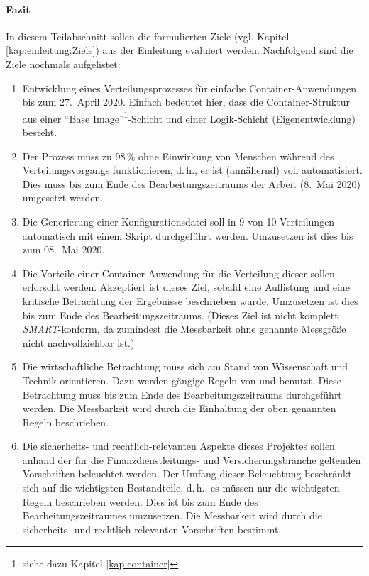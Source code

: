 \paragraph{Fazit}
In diesem Teilabschnitt sollen die formulierten Ziele (vgl. Kapitel \vref{kap:einleitung:Ziele}) aus der Einleitung evaluiert werden. Nachfolgend sind die Ziele nochmals aufgelistet:

\begin{enumerate}
	\item Entwicklung eines Verteilungsprozesses für einfache Container-Anwendungen bis zum 27.~April 2020. Einfach bedeutet hier, dass die Container-Struktur aus einer \enquote{Base Image}\footnote{siehe dazu Kapitel \vref{kap:container}}-Schicht und einer Logik-Schicht (Eigenentwicklung) besteht.
	\item Der Prozess muss zu 98\,\% ohne Einwirkung von Menschen während des Verteilungsvorgangs funktionieren, d.\,h., er ist (annähernd) voll automatisiert. Dies muss bis zum Ende des Bearbeitungszeitraums der Arbeit (8.~Mai 2020) umgesetzt werden.
	\item Die Generierung einer Konfigurationsdatei soll in 9 von 10 Verteilungen automatisch mit einem Skript durchgeführt werden. Umzusetzen ist dies bis zum 08.~Mai 2020.
	\item Die Vorteile einer Container-Anwendung für die Verteilung dieser sollen erforscht werden. Akzeptiert ist dieses Ziel, sobald eine Auflistung und eine kritische Betrachtung der Ergebnisse beschrieben wurde. Umzusetzen ist dies bis zum Ende des Bearbeitungszeitraums. (Dieses Ziel ist nicht komplett \textit{SMART}-konform, da zumindest die Messbarkeit ohne genannte Messgröße nicht nachvollziehbar ist.)
	\item Die wirtschaftliche Betrachtung muss sich am Stand von Wissenschaft und Technik orientieren. Dazu werden gängige Regeln von \cite{herman_is_2009} und \cite{brugger_it_2009} benutzt. Diese Betrachtung muss bis zum Ende des Bearbeitungszeitraums durchgeführt werden. Die Messbarkeit wird durch die Einhaltung der oben genannten Regeln beschrieben.
	\item Die sicherheits- und rechtlich-relevanten Aspekte dieses Projektes sollen anhand der für die Finanzdienstleitungs- und Versicherungsbranche geltenden Vorschriften beleuchtet werden. Der Umfang dieser Beleuchtung beschränkt sich auf die wichtigsten Bestandteile, d.\,h., es müssen nur die wichtigsten Regeln beschrieben werden. Dies ist bis zum Ende des Bearbeitungszeitraumes umzusetzen. Die Messbarkeit wird durch die sicherheits- und rechtlich-relevanten Vorschriften bestimmt.
\end{enumerate}

